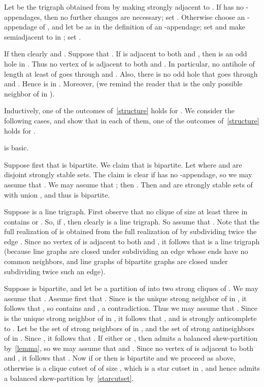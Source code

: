 \documentclass[11 pt] {article}
\newcounter{claim}
\begin{document}
Let  be the trigraph obtained from  by making  strongly
adjacent to . If  has no -appendages, then no further changes
are necessary; set . Otherwise choose an -appendage
 of , and let  be as in the definition of an -appendage;
set  and make  semiadjacent to 
in ; set .

If  then clearly  and . Suppose that . If  is adjacent to
both  and , then  is an odd hole in
. Thus no vertex of  is adjacent to both  and . In
particular, no antihole of length at least  of  goes through
 and .  Also, there is no odd hole that goes through  and
.  Hence  is in . Moreover,  (we
remind the reader that  is the only possible neighbor of  in
).

Inductively, one of the outcomes of~\ref{structure} holds for .
We consider the following cases, and show that in each of them, one of
the outcomes of~\ref{structure} holds for .

  is basic.

Suppose first that  is bipartite.  We claim that  is bipartite.
Let  where  and  are disjoint strongly stable
sets. The claim is clear if  has no -appendage, so we may
assume that . We may assume that ; then . Then  and  are strongly stable sets of
 with union , and thus  is bipartite.

Suppose  is a line trigraph.  First observe that no clique of size
at least three in  contains  or . So, if ,
then clearly  is a line trigraph. So assume that . Note that the full realization of  is obtained from the
full realization of  by subdividing twice the edge . Since no
vertex of  is adjacent to both  and , it follows that  is a
line trigraph (because line graphs are closed under subdividing an
edge whose ends have no common neighbors, and line graphs of bipartite
graphs are closed under subdividing twice such an edge).

Suppose  is bipartite, and let  be a partition of
 into two strong cliques of . We may assume that . Assume first that . Since  is the unique strong
neighbor of  in , it follows that , so  contains
 and , a contradiction. Thus we may assume that . Since
 is the unique strong neighbor of  in , it follows that
, and  is strongly anticomplete to . Let  be the set of strong neighbors of  in , and  the set of strong antineighbors of  in . Since , it follows that . If either  or , then  admits a balanced
skew-partition by~\ref{lemma}, so we may assume that  and
. Since no vertex of  is adjacent to both  and ,
it follows that . Now if  or  then  is bipartite and we proceed as above, otherwise
 is a clique cutset of  of size , which is a
star cutset in , and hence  admits a balanced skew-partition
by~\ref{starcutset}.
\end{document}
